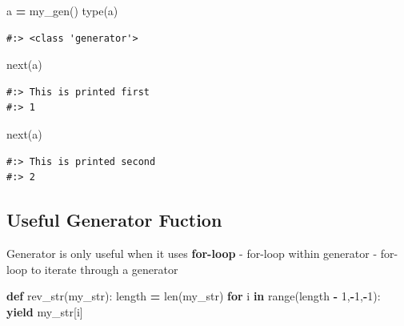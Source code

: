 \documentclass[
]{book}
\newenvironment{Shaded}{\begin{snugshade}}{\end{snugshade}}
\newcommand{\BuiltInTok}[1]{#1}
\newcommand{\ControlFlowTok}[1]{\textcolor[rgb]{0.27,0.27,0.27}{\textbf{#1}}}
\newcommand{\DecValTok}[1]{\textcolor[rgb]{0.06,0.06,0.06}{#1}}
\newcommand{\KeywordTok}[1]{\textcolor[rgb]{0.27,0.27,0.27}{\textbf{#1}}}
\newcommand{\NormalTok}[1]{#1}
\newcommand{\OperatorTok}[1]{\textcolor[rgb]{0.43,0.43,0.43}{\textbf{#1}}}
\begin{document}
\begin{Shaded}
\begin{Highlighting}[]
\NormalTok{a }\OperatorTok{=}\NormalTok{ my_gen()}
\BuiltInTok{type}\NormalTok{(a)}
\end{Highlighting}
\end{Shaded}

\begin{verbatim}
#:> <class 'generator'>
\end{verbatim}

\begin{Shaded}
\begin{Highlighting}[]
\BuiltInTok{next}\NormalTok{(a)}
\end{Highlighting}
\end{Shaded}

\begin{verbatim}
#:> This is printed first
#:> 1
\end{verbatim}

\begin{Shaded}
\begin{Highlighting}[]
\BuiltInTok{next}\NormalTok{(a)}
\end{Highlighting}
\end{Shaded}

\begin{verbatim}
#:> This is printed second
#:> 2
\end{verbatim}

\hypertarget{useful-generator-fuction}{%
\subsection{Useful Generator Fuction}\label{useful-generator-fuction}}

Generator is only useful when it uses \textbf{for-loop} - for-loop within generator - for-loop to iterate through a generator

\begin{Shaded}
\begin{Highlighting}[]
\KeywordTok{def}\NormalTok{ rev_str(my_str):}
\NormalTok{    length }\OperatorTok{=} \BuiltInTok{len}\NormalTok{(my_str)}
    \ControlFlowTok{for}\NormalTok{ i }\KeywordTok{in} \BuiltInTok{range}\NormalTok{(length }\OperatorTok{-} \DecValTok{1}\NormalTok{,}\OperatorTok{-}\DecValTok{1}\NormalTok{,}\OperatorTok{-}\DecValTok{1}\NormalTok{):}
        \ControlFlowTok{yield}\NormalTok{ my_str[i]}
\end{Highlighting}
\end{Shaded}
\end{document}
